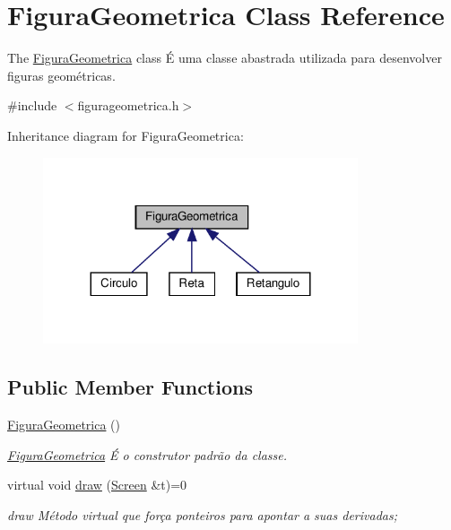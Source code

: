 \hypertarget{class_figura_geometrica}{}\section{Figura\+Geometrica Class Reference}
\label{class_figura_geometrica}


The \hyperlink{class_figura_geometrica}{Figura\+Geometrica} class É uma classe abastrada utilizada para desenvolver figuras geométricas.  




{\ttfamily \#include $<$figurageometrica.\+h$>$}



Inheritance diagram for Figura\+Geometrica\+:
\nopagebreak
\begin{figure}[H]
\begin{center}
\leavevmode
\includegraphics[width=263pt]{class_figura_geometrica__inherit__graph}
\end{center}
\end{figure}
\subsection*{Public Member Functions}
\begin{DoxyCompactItemize}
\item 
\mbox{\label{class_figura_geometrica_a81d7c7efaea511e60a15f5a363138dd9}} 
\hyperlink{class_figura_geometrica_a81d7c7efaea511e60a15f5a363138dd9}{Figura\+Geometrica} ()
\begin{DoxyCompactList}\small\item\em \hyperlink{class_figura_geometrica}{Figura\+Geometrica} É o construtor padrão da classe. \end{DoxyCompactList}\item 
virtual void \hyperlink{class_figura_geometrica_a8ee8dedc060b6059a805ea091aef2c41}{draw} (\hyperlink{class_screen}{Screen} \&t)=0
\begin{DoxyCompactList}\small\item\em draw Método virtual que força ponteiros para apontar a suas derivadas; \end{DoxyCompactList}\end{DoxyCompactItemize}


